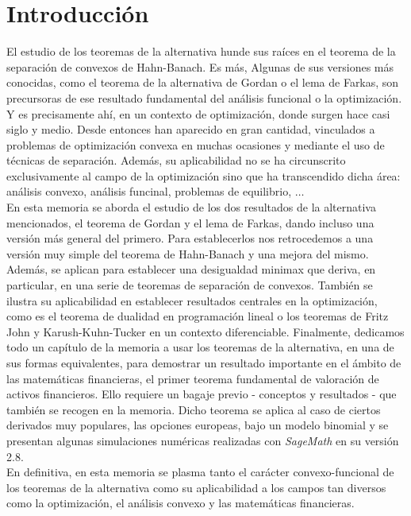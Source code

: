 \chapter{Introducción}
El estudio de los teoremas de la alternativa hunde sus raíces en el teorema de la separación de convexos de Hahn-Banach. Es más, Algunas de sus versiones más conocidas, como el teorema de la alternativa de Gordan o el lema de Farkas, son precursoras de ese resultado fundamental del análisis funcional o la optimización. Y es precisamente ahí, en un contexto de optimización, donde surgen hace casi siglo y medio. Desde entonces han aparecido en gran cantidad, vinculados a problemas de optimización convexa en muchas ocasiones y mediante el uso de técnicas de separación. Además, su aplicabilidad no se ha circunscrito exclusivamente al campo de la optimización sino que ha transcendido dicha área: análisis convexo, análisis funcinal, problemas de equilibrio, $ \dots $ \\

En esta memoria se aborda el estudio de los dos resultados de la alternativa mencionados, el teorema de Gordan y el lema de Farkas, dando incluso una versión más general del primero. Para establecerlos nos retrocedemos a una versión muy simple del teorema de Hahn-Banach y una mejora del mismo. Además, se aplican para establecer una desigualdad minimax que deriva, en particular, en una serie de teoremas de separación de convexos. También se ilustra su aplicabilidad en establecer resultados centrales en la optimización, como es el teorema de dualidad en programación lineal o los teoremas de Fritz John y Karush-Kuhn-Tucker en un contexto diferenciable. Finalmente, dedicamos todo un capítulo de la memoria a usar los teoremas de la alternativa, en una de sus formas equivalentes, para demostrar un resultado importante en el ámbito de las matemáticas financieras, el primer teorema fundamental de valoración de activos financieros. Ello requiere un bagaje previo - conceptos y resultados - que también se recogen en la memoria. Dicho teorema se aplica al caso de ciertos derivados muy populares, las opciones europeas, bajo un modelo binomial y se presentan algunas simulaciones numéricas realizadas con \textit{SageMath} en su versión 2.8. \\

En definitiva, en esta memoria se plasma tanto el carácter convexo-funcional de los teoremas de la alternativa como su aplicabilidad a los campos tan diversos como la optimización, el análisis convexo y las matemáticas financieras. 